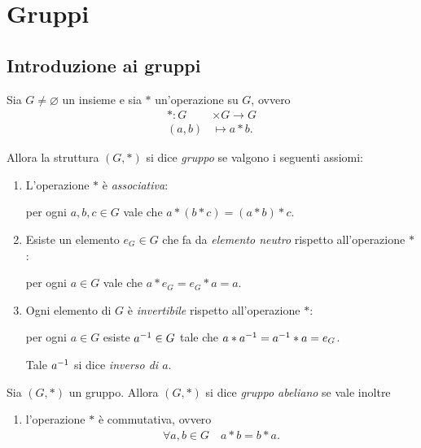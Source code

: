\chapter{Gruppi}

\section{Introduzione ai gruppi}

\begin{definition}
    [Gruppo] \label{def:gruppo}
    Sia $G \neq \varnothing$ un insieme e sia $*$ un'operazione su $G$, ovvero \begin{align*}
        * : G  &\times  G \to G\\
        (a, b) &\mapsto a*b.
    \end{align*}
    
    Allora la struttura $(G, *)$ si dice \emph{gruppo} se valgono i seguenti assiomi: \begin{enumerate}[label={(G\arabic*)}]
        \item \label{def:gruppo:ass} L'operazione $*$ è \emph{associativa}:
        
        per ogni $a, b, c \in G$ vale che $a * (b * c) = (a * b) * c$.
        \item Esiste un elemento $e_G \in G$ che fa da \emph{elemento neutro} rispetto all'operazione $*$:
        
        per ogni $a \in G$ vale che $a * e_G = e_G * a = a$.
        \item Ogni elemento di $G$ è \emph{invertibile} rispetto all'operazione $*$:
        
        per ogni $a \in G$ esiste $a^{-1} \in G$ tale che $a * a^{-1} = a^{-1} * a = e_G$.
        
        Tale $a^{-1}$ si dice \emph{inverso di $a$}.
    \end{enumerate}
\end{definition}

\begin{definition}
     \label{def:gruppo abeliano}
    Sia  $(G, *)$ un gruppo.
    Allora $(G, *)$ si dice \emph{gruppo abeliano} se vale inoltre \begin{enumerate}[label={(G\arabic*)}, start=4]
        \item l'operazione $*$ è commutativa, ovvero \begin{align*}
            \forall a, b \in G \quad a * b = b * a.
        \end{align*}
    \end{enumerate}
\end{definition}

